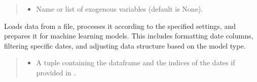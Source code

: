 \documentclass[letterpaper,10pt,english]{sphinxmanual}
\begin{document}
\begin{fulllineitems}
\begin{quote}
\begin{description}
\begin{itemize}
\item {} 
\sphinxAtStartPar
{} \textendash{} Name or list of exogenous variables (default is None).

\end{itemize}

\end{description}\end{quote}

\begin{fulllineitems}
\label{\detokenize{docs/data_loader:data_loader.DataLoader.load_data}}
\pysigstartsignatures
{}
\pysigstopsignatures
\sphinxAtStartPar
Loads data from a file, processes it according to the specified settings,
and prepares it for machine learning models. This includes formatting date columns,
filtering specific dates, and adjusting data structure based on the model type.
\begin{quote}\begin{description}
\sphinxAtStartPar
\begin{itemize}
\item {} 
\sphinxAtStartPar
A tuple containing the dataframe and the indices of the dates if provided in .

\end{itemize}


\end{description}\end{quote}

\end{fulllineitems}


\end{fulllineitems}


\sphinxstepscope
\end{document}
